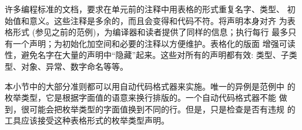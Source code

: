 许多编程标准的文档，要求在单元前的注释中用表格的形式重复名字、类型、
初始值和意义。这些注释是多余的，而且会变得和代码不符。将声明本身对齐
为表格形式 (参见之前的范例)，为编译器和读者提供了同样的信息；执行每行
最多只有一个声明；为初始化加空间和必要的注释以方便维护。表格化的版面
增强可读性，避免名字在大量的声明中``隐藏''起来。这些对所有的声明都有效:
类型、子类型、对象、异常、数字命名等等。

\begin{blockindent}
本小节中的大部分准则都可以用自动代码格式器来实施。唯一的异例是范例中
的枚举类型，它是根据字面值的语意来换行排版的。一个自动代码格式器不能
做到，很可能会把枚举类型的字面值换到不同的行。但是，只是检查是否有违规
的工具应该接受这种表格形式的枚举类型声明。
\end{blockindent}

